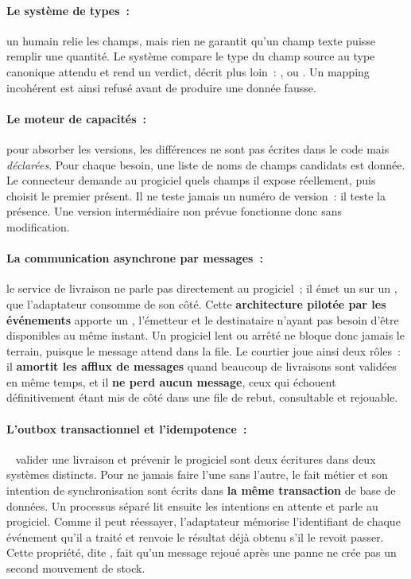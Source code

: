 \paragraph{Le système de types~:} un humain relie les champs, mais rien ne garantit qu'un champ texte
puisse remplir une quantité. Le système compare le type du champ source au type canonique attendu et
rend un verdict, décrit plus loin~: ,  ou . Un mapping
incohérent est ainsi refusé avant de produire une donnée fausse.

\paragraph{Le moteur de capacités~:} pour absorber les versions, les différences ne sont pas écrites
dans le code mais \emph{déclarées}. Pour chaque besoin, une liste de noms de champs candidats est
donnée. Le connecteur demande au progiciel quels champs il expose réellement, puis choisit le premier
présent. Il ne teste jamais un numéro de version~: il teste la présence. Une version intermédiaire non
prévue fonctionne donc sans modification.

\paragraph{La communication asynchrone par messages~:} le service de livraison ne parle pas
directement au progiciel~; il émet un  sur un , que
l'adaptateur consomme de son côté. Cette \textbf{architecture pilotée par les événements} apporte un
, l'émetteur et le destinataire n'ayant pas besoin d'être disponibles au
même instant. Un progiciel lent ou arrêté ne bloque donc jamais le terrain, puisque le message attend
dans la file. Le courtier joue ainsi deux rôles~: il \textbf{amortit les afflux de messages} quand
beaucoup de livraisons sont validées en même temps, et il \textbf{ne perd aucun message}, ceux qui
échouent définitivement étant mis de côté dans une file de rebut, consultable et rejouable.

\paragraph{L'outbox transactionnel et l'idempotence~:}~\cite{richardson18} valider une livraison et prévenir le progiciel
sont deux écritures dans deux systèmes distincts. Pour ne jamais faire l'une sans l'autre, le fait
métier et son intention de synchronisation sont écrits dans \textbf{la même transaction} de base de
données. Un processus séparé lit ensuite les intentions en attente et parle au progiciel. Comme il
peut réessayer, l'adaptateur mémorise l'identifiant de chaque événement qu'il a traité et renvoie le
résultat déjà obtenu s'il le revoit passer. Cette propriété, dite , fait qu'un
message rejoué après une panne ne crée pas un second mouvement de stock.

